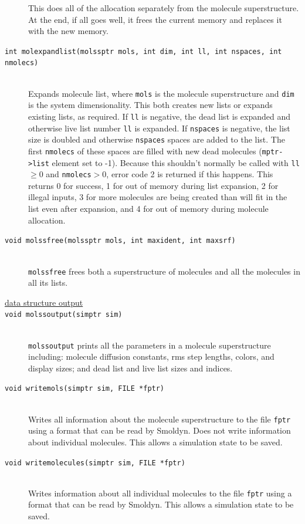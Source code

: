 \documentclass {scrbook}
\newcommand {\ttt} {\texttt}
\begin{document}
\begin{description}
This does all of the allocation separately from the molecule superstructure. At the end, if all goes well, it frees the current memory and replaces it with the new memory.

\item[\ttt{int molexpandlist(molssptr mols, int dim, int ll, int nspaces, int nmolecs)}]
\hfill \\
Expands molecule list, where \ttt{mols} is the molecule superstructure and \ttt{dim} is the system dimensionality. This both creates new lists or expands existing lists, as required. If \ttt{ll} is negative, the dead list is expanded and otherwise live list number \ttt{ll} is expanded. If \ttt{nspaces} is negative, the list size is doubled and otherwise \ttt{nspaces} spaces are added to the list. The first \ttt{nmolecs} of these spaces are filled with new dead molecules (\ttt{mptr->list} element set to -1). Because this shouldn't normally be called with \ttt{ll}$\ge$0 and \ttt{nmolecs}$>$0, error code 2 is returned if this happens. This returns 0 for success, 1 for out of memory during list expansion, 2 for illegal inputs, 3 for more molecules are being created than will fit in the list even after expansion, and 4 for out of memory during molecule allocation.

\item[\ttt{void molssfree(molssptr mols, int maxident, int maxsrf)}]
\hfill \\
\ttt{molssfree} frees both a superstructure of molecules and all the molecules in all its lists.

\item[\underline{data structure output}]

\item[\ttt{void molssoutput(simptr sim)}]
\hfill \\
\ttt{molssoutput} prints all the parameters in a molecule superstructure including: molecule diffusion constants, rms step lengths, colors, and display sizes; and dead list and live list sizes and indices.

\item[\ttt{void writemols(simptr sim, FILE *fptr)}]
\hfill \\
Writes all information about the molecule superstructure to the file \ttt{fptr} using a format that can be read by Smoldyn. Does not write information about individual molecules. This allows a simulation state to be saved.

\item[\ttt{void writemolecules(simptr sim, FILE *fptr)}]
\hfill \\
Writes information about all individual molecules to the file \ttt{fptr} using a format that can be read by Smoldyn. This allows a simulation state to be saved.


\end{description}
\end{document}
